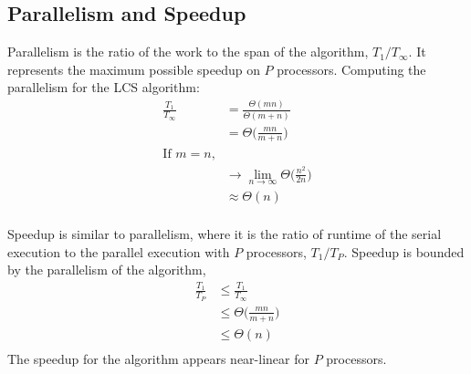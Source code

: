 \documentclass[usletter, 11pt]{extarticle}
\begin{document}
        \subsection{Parallelism and Speedup} Parallelism is the ratio of the
        work to the span of the algorithm, $T_1/T_\infty$. It represents the
        maximum possible speedup on $P$ processors. Computing the parallelism
        for the LCS algorithm:
        \begin{equation*}
            \begin{split}
                \frac{T_1}{T_\infty} & = \frac{\Theta(mn)}{\Theta(m+n)} \\
                & = \Theta\Bigg(\frac{mn}{m+n}\Bigg) \\
                \text{If $m = n$,} & \\
                & \rightarrow \lim_{n\to\infty}
                \Theta\Bigg(\frac{n^2}{2n}\Bigg) \\
                & \approx \Theta(n) \\
            \end{split}
        \end{equation*}

        Speedup is similar to parallelism, where it is the ratio of runtime of
        the serial execution to the parallel execution with $P$ processors,
        $T_1/T_P$. Speedup is bounded by the parallelism of the algorithm,
        \begin{equation*}
            \begin{split}
                \frac{T_1}{T_P} & \le \frac{T_1}{T_\infty} \\
                & \le \Theta\Bigg(\frac{mn}{m+n}\Bigg) \\
                & \le \Theta(n) \\
            \end{split}
        \end{equation*}
        The speedup for the algorithm appears near-linear for $P$ processors.
\end{document}
